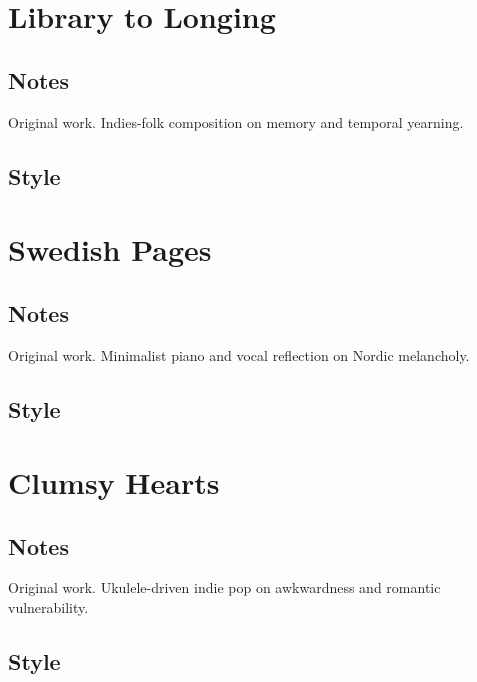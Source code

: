 \section{Library to Longing}

\subsection{Notes}
Original work.
Indies-folk composition on memory and temporal yearning.

\subsection{Style}

\begin{lyrics}
\end{lyrics}

\section{Swedish Pages}

\subsection{Notes}
Original work.
Minimalist piano and vocal reflection on Nordic melancholy.

\subsection{Style}

\begin{lyrics}
\end{lyrics}

\section{Clumsy Hearts}

\subsection{Notes}
Original work.
Ukulele-driven indie pop on awkwardness and romantic vulnerability.

\subsection{Style}

